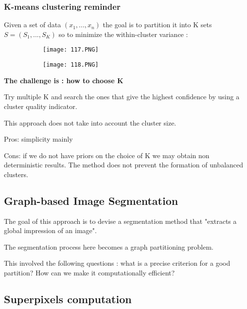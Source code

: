 \documentclass{article}
\begin{document}
\subsubsection{K-means clustering reminder}

Given a set of data $(x_1,...,x_n)$ the goal is to partition it into K sets $S = (S_1,...,S_K)$ so to minimize the within-cluster variance :

\begin{figure}[ht!]
  \centering
  \begin{subfigure}[b]{0.7\linewidth}
    \texttt{[image: 117.PNG]}
  \end{subfigure}
\end{figure}

\begin{figure}[ht!]
  \centering
  \begin{subfigure}[b]{0.5\linewidth}
    \texttt{[image: 118.PNG]}
  \end{subfigure}
\end{figure}

\textbf{The challenge is : how to choose K}

Try multiple K and search the ones that give the highest confidence by using a cluster quality indicator.

This approach does not take into account the cluster size.

Pros: simplicity mainly

Cons: if we do not have priors on the choice of K we may obtain non deterministic results. The method does not prevent the formation of unbalanced clusters.

\vspace{20mm}

\subsection{Graph-based Image Segmentation}

The goal of this approach is to devise a segmentation method that "extracts a global impression of an image".

The segmentation process here becomes a graph partitioning problem.

This involved the following questions : what is a precise criterion for a good partition? How can we make it computationally efficient?

\subsection{Superpixels computation}
\end{document}
